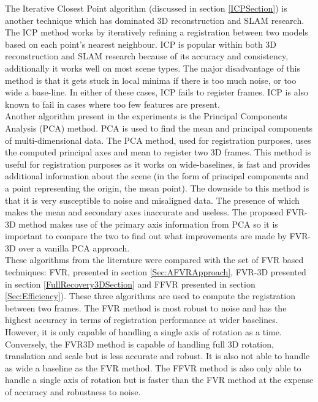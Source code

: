 The Iterative Closest Point algorithm (discussed in section \ref{ICPSection}) is another technique which has dominated 3D reconstruction and SLAM research. The ICP method works by iteratively refining a registration between two models based on each point's nearest neighbour. ICP is popular within both 3D reconstruction and SLAM research because of its accuracy and consistency, additionally it works well on most scene types. The major disadvantage of this method is that it gets stuck in local minima if there is too much noise, or too wide a base-line. In either of these cases, ICP fails to register frames. ICP is also known to fail in cases where too few features are present. \\

Another algorithm present in the experiments is the Principal Components Analysis (PCA) method. PCA is used to find the mean and principal components of multi-dimensional data. The PCA method, used for registration purposes, uses the computed principal axes and mean to register two 3D frames. This method is useful for registration purposes as it works on wide-baselines, is fast and provides additional information about the scene (in the form of principal components and a point representing the origin, the mean point). The downside  to this method is that it is very susceptible to noise and misaligned data. The presence of which makes the mean and secondary axes inaccurate and useless. The proposed FVR-3D method makes use of the primary axis information from PCA so it is important to compare the two to find out what improvements are made by FVR-3D over a vanilla PCA approach. \\

These algorithms from the literature were compared with the set of FVR based techniques: FVR, presented in section \ref{Sec:AFVRApproach}, FVR-3D presented in section \ref{FullRecovery3DSection} and FFVR presented in section \ref{Sec:Efficiency}). These three algorithms are used to compute the registration between two frames. The FVR method is most robust to noise and has the highest accuracy in terms of registration performance at wider baselines. However, it is only capable of handling a single axis of rotation as a time. Conversely, the FVR3D method is capable of handling full 3D rotation, translation and scale but is less accurate and robust. It is also not able to handle as wide a baseline as the FVR method. The FFVR method is also only able to handle a single axis of rotation but is faster than the FVR method at the expense of accuracy and robustness to noise. \\
